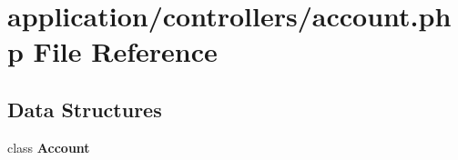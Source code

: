 \section{application/controllers/account.php File Reference}
\label{account_8php}
\subsection*{Data Structures}
\begin{DoxyCompactItemize}
\item 
class {\bf Account}
\end{DoxyCompactItemize}

